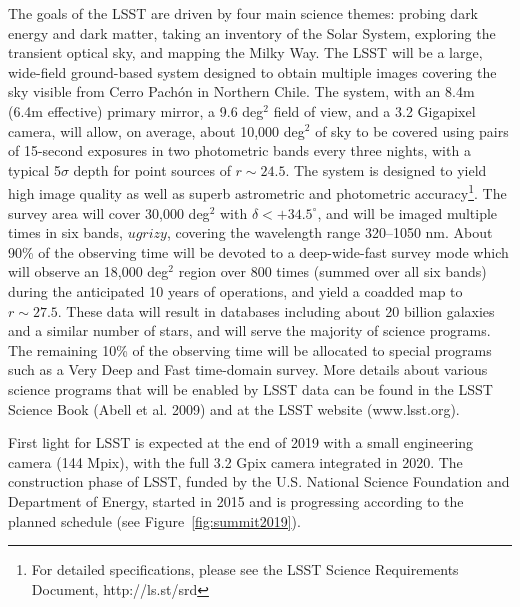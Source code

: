 \documentclass{iau}
\begin{document}
The goals of the LSST are driven by four main science themes: probing dark energy and dark matter, 
taking an inventory of the Solar System, exploring the transient optical sky, and mapping the 
Milky Way. The LSST will be a large, wide-field ground-based system designed to obtain multiple 
images covering the sky visible from Cerro Pach\'{o}n in Northern Chile. 
The system, with an 8.4m (6.4m effective) primary mirror, a 9.6 deg$^2$ field 
of view, and a 3.2 Gigapixel camera, will allow, on average, about 10,000 deg$^2$ of sky to be covered 
using pairs of 15-second exposures in two photometric bands every three nights, 
with a typical 5$\sigma$ depth for point sources of $r\sim24.5$. The system is designed to 
yield high image quality as well as superb astrometric and photometric accuracy\footnote{For 
detailed specifications, please see the LSST Science Requirements Document, http://ls.st/srd}. 
The survey area will cover 30,000 deg$^2$ with $\delta<+34.5^\circ$, and will be imaged multiple times in six bands, $ugrizy$, covering the wavelength range 320--1050 nm. About 90\% of the 
observing time will be devoted to a deep-wide-fast survey mode which will observe an
18,000 deg$^2$ region over 800 times (summed over all six bands) during the anticipated 
10 years of operations, and yield a coadded map to $r\sim27.5$. These data will result in 
databases including about 20 billion galaxies and a similar number of stars, and will 
serve the majority of science programs. The remaining 10\% of the observing time 
will be allocated to special programs such as a Very Deep and Fast time-domain 
survey. More details about various science programs that will be enabled by LSST data
can be found in the LSST Science Book (Abell et al. 2009) and at the LSST website (www.lsst.org). 

First light for LSST is expected at the end of  2019 with a small engineering camera (144 Mpix), with 
the full 3.2 Gpix camera integrated in 2020. The construction phase of LSST, funded by the U.S. 
National Science Foundation and Department of Energy, started in 2015 and is progressing
according to the planned schedule (see Figure~\ref{fig:summit2019}). 
\end{document}

